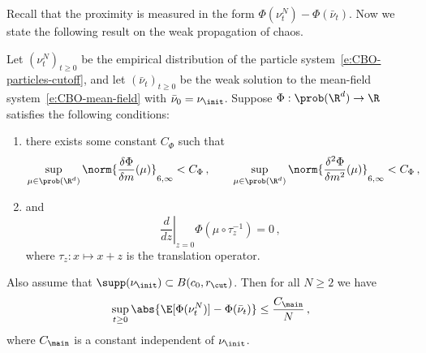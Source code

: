 \documentclass{amsart}
\begin{document}
Recall that the proximity is measured in the form $\Phi(\nu^N_t) - \Phi(\bar \nu_t)$. 
Now we state the following result on the weak propagation of chaos. 
\begin{theorem}
\label{t:main}
    Let $(\nu^N_t)_{t \ge 0}$ be the empirical distribution of the particle system~\eqref{e:CBO-particles-cutoff}, and let $(\bar \nu_t)_{t \ge 0}$ be the weak solution to the mean-field system~\eqref{e:CBO-mean-field} with $\bar \nu_0 = \nu_{\init}$.
    Suppose $\Phi: \prob(\R^d) \to \R$ satisfies the following conditions:
    \begin{enumerate}
        \item there exists some constant $C_\Phi$ such that 
        \begin{equation}
        \label{e:phi-reg-6}
            \sup_{\mu\in \prob(\R^d)} \norm{\frac{\delta \Phi}{\delta m}(\mu)}_{6,\infty} < C_\Phi \,, \qquad \sup_{\mu\in \prob(\R^d)} \norm{\frac{\delta^2 \Phi}{\delta m^2}(\mu)}_{6,\infty} < C_\Phi \,,
        \end{equation}
        \item and 
        \begin{equation}
        \label{e:phi-translate-inv}
            \left. \frac{d}{dz} \right\vert_{z=0} \Phi(\mu \circ \tau_z^{-1}) = 0 \,,
        \end{equation}
        where $\tau_z: x \mapsto x+z$ is the translation operator.
    \end{enumerate}
    Also assume that $\supp(\nu_\init) \subset B(c_0,r_\cut)$. 
    Then for all $N \ge 2$ we have 
    \begin{equation*}
        \sup_{t \ge 0} \abs{ \E[\Phi(\nu^N_t)] - \Phi(\bar \nu_t) } \le \frac{C_\main}{N} \,,
    \end{equation*}
    where $C_{\main}$ is a constant independent of $\nu_\init$.
\end{theorem}
\iffalse 
\end{document}
